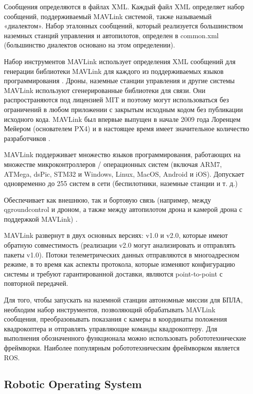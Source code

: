 Сообщения определяются в файлах XML. Каждый файл XML определяет набор сообщений, поддерживаемый MAVLink системой, также называемый «диалектом». Набор эталонных сообщений, который реализуется большинством наземных станций управления и автопилотов, определен в common.xml (большинство диалектов основано на этом определении).

Набор инструментов MAVLink использует определения XML сообщений для генерации библиотеки MAVLink для каждого из поддерживаемых языков программирования . Дроны, наземные станции управления и другие системы MAVLink используют сгенерированные библиотеки для связи. Они распространяются под лицензией MIT и поэтому могут использоваться без ограничений в любом приложении с закрытым исходным кодом без публикации исходного кода. MAVLink был впервые выпущен в начале 2009 года Лоренцем Мейером (основателем PX4) и в настоящее время имеет значительное количество разработчиков \cite{px}.

MAVLink поддерживает множество языков программирования, работающих на множестве микроконтроллеров / операционных систем (включая ARM7, ATMega, dsPic, STM32 и Windows, Linux, MacOS, Android и iOS). Допускает одновременно до 255 систем в сети (беспилотники, наземные станции и т. д.)

Обеспечивает как внешнюю, так и бортовую связь (например, между q\-ground\-con\-trol и дроном, а также между автопилотом дрона и камерой дрона с поддержкой MAVLink) \cite{mavlink}.

MAVLink развернут в двух основных версиях: v1.0 и v2.0, которые имеют обратную совместимость (реализации v2.0 могут анализировать и отправлять пакеты v1.0). Потоки телеметрических данных отправляются в многоадресном режиме, в то время как аспекты протокола, которые изменяют конфигурацию системы и требуют гарантированной доставки, являются point-to-point с повторной передачей.


Для того, чтобы запускать на наземной станции автономные миссии для БПЛА, необходим набор инструментов, позволяющий обрабатывать MAVLink сообщения, преобразовывать показания с камеры в координаты положения квадрокоптера и отправлять управляющие команды квадрокоптеру. Для выполнения обозначенного функционала можно использовать робототехнические фреймворки. Наиболее популярным робототехническим фреймворком является ROS.
\subsection{Robotic Operating System}

